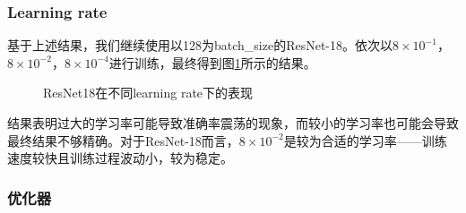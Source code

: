 \documentclass[hyperref, UTF8, 12pt]{article}
\theoremstyle{definition}
\begin{document}
\subsubsection{Learning rate}
基于上述结果，我们继续使用以128为batch\_size的ResNet-18。依次以$8\times10^{-1}$，$8\times10^{-2}$，$8\times10^{-4}$进行训练，最终得到图\ref{fig:resnet18_lr}所示的结果。
\begin{figure}[H]
	\centering
	\caption{ResNet18在不同learning rate下的表现}
	\label{fig:resnet18_lr}
\end{figure}
结果表明过大的学习率可能导致准确率震荡的现象，而较小的学习率也可能会导致最终结果不够精确。对于ResNet-18而言，$8\times10^{-2}$是较为合适的学习率——训练速度较快且训练过程波动小，较为稳定。
\subsubsection{优化器}
\end{document}
